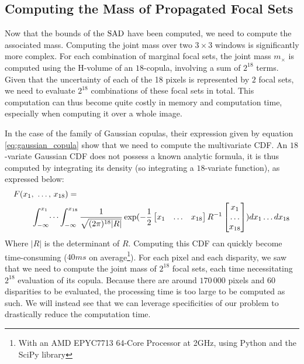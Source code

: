 \subsection{Computing the Mass of Propagated Focal Sets}\label{sec:propagated_masses}
Now that the bounds of the ${\mathrm{SAD}}$ have been computed, we need to compute the associated mass. Computing the joint mass over two $3 \times 3$ windows is significantly more complex. For each combination of marginal focal sets, the joint mass $m_{\times}$ is computed using the H-volume of an $18$-copula, involving a sum of $2^{18}$ terms. Given that the uncertainty of each of the 18 pixels is represented by $2$ focal sets, we need to evaluate $2^{18}$ combinations of these focal sets in total. This computation can thus become quite costly in memory and computation time, especially when computing it over a whole image.

In the case of the family of Gaussian copulas, their expression given by equation \eqref{eq:gaussian_copula} show that we need to compute the multivariate CDF. An $18$-variate Gaussian CDF does not possess a known analytic formula, it is thus computed by integrating its density (so integrating a $18$-variate function), as expressed below:
\begin{align}\label{eq:gaussian_cdf}
    F(x_1 &{, ~\dots, ~} x_{18}) =\nonumber\\ &\int_{-\infty}^{x_1}\dots\int_{-\infty}^{x_{18}}\frac{1}{\sqrt{(2\pi)^{18}|R|}}\exp(-\frac{1}{2}\begin{bmatrix}x_1 & \dots & x_{18}\end{bmatrix}R^{-1}\begin{bmatrix}x_1 \\ \dots \\ x_{18}\end{bmatrix})dx_1\dots dx_{18}
\end{align}
Where $|R|$ is the determinant of $R$. Computing this CDF can quickly become time-consuming ($40ms$ on average\footnote{With an AMD EPYC7713  64-Core Processor at 2GHz, using Python and the SciPy library}). For each pixel and each disparity, we saw that we need to compute the joint mass of $2^{18}$ focal sets, each time necessitating $2^{18}$ evaluation of its copula. Because there are around $170\,000$ pixels and $60$ disparities to be evaluated, the processing time is too large to be computed as such. We will instead see that we can leverage specificities of our problem to drastically reduce the computation time.
 
